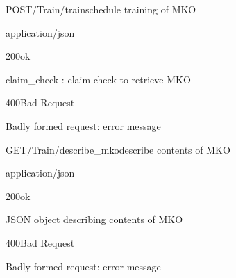 \documentclass[12pt, etter]{article}
\begin{document}
\begin{apiRoute}{POST}{/Train/train}{schedule training of MKO}
    \begin{routeParameter}
    \end{routeParameter}
    \begin{routeResponse}{application/json}
        \begin{routeResponseItem}{200}{ok}
            \begin{routeResponseItemBody}
                claim_check : claim check to retrieve MKO
            \end{routeResponseItemBody}
        \end{routeResponseItem}
        \begin{routeResponseItem}{400}{Bad Request}
            \begin{routeResponseItemBody}
                Badly formed request: {error message}
            \end{routeResponseItemBody}
        \end{routeResponseItem}
    \end{routeResponse}
\end{apiRoute}

\begin{apiRoute}{GET}{/Train/describe\_mko}{describe contents of MKO}
    \begin{routeParameter}
    \end{routeParameter}
    \begin{routeResponse}{application/json}
        \begin{routeResponseItem}{200}{ok}
            \begin{routeResponseItemBody}
                JSON object describing contents of MKO
            \end{routeResponseItemBody}
        \end{routeResponseItem}
        \begin{routeResponseItem}{400}{Bad Request}
            \begin{routeResponseItemBody}
                Badly formed request: {error message}
            \end{routeResponseItemBody}
        \end{routeResponseItem}
    \end{routeResponse}
\end{apiRoute}
\end{document}
